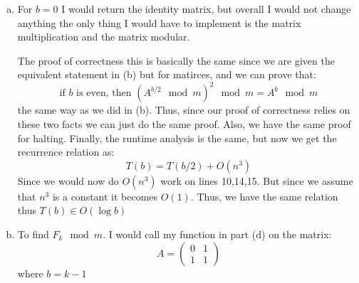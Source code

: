 \documentclass[12pt, letterpaper]{article}
\theoremstyle{definition}
\newcommand{\N}{\mathbb{N}}
\renewcommand{\t}[1]{\text{#1}}
\begin{document}
\begin{enumerate}[(a)]
\begin{itemize}
        Thus, by induction our algorithm works for all $n \in \N$.

        \item (Proof it Stops)
        
        Let our potential function be $b$. WLOG let $b \neq 0,1$ since we would halt immediately.

        Thus, if $b$ is even then $b \mapsto b/2 < b$, and the minimum $b$ can be without halting the program immediately is $2$ thus $b-b/2 \geq 2-1= 1$

        If $b$ is odd then $b-1$ is even thus $b \mapsto (b-1)/2 < b$. Again the min odd number without halting immediately is $3$ thus $b-(b-1)/2 \geq 3-1=2$

        Our function is lower bounded by $0$. Thus our functions stops.

        \item (Runtime Analysis)
        
        We can ignore the base cases since they are all $O(1)$ operations. Now, if $b$ is even then we call on our function on $b/2$, and this is the same in the odd case, and since we return after the recursive call we only make one each loop. The rest of the lines we can assume do $O(1)$ work thus we end up with the recurrence relation:
        \[T(b)=T(b/2)+O(1)\]
        Thus by the Master Theorem we get that $T(b) \in O(\log b)$
    \end{itemize}

    \item For $b=0$ I would return the identity matrix, but overall I would not change anything the only thing I would have to implement is the matrix multiplication and the matrix modular.
    
    The proof of correctness this is basically the same since we are given the equivalent statement in (b) but for matirces, and we can prove that:
    \[\t{if } b \t{ is even, then } (A^{b/2} \mod m)^2 \mod m = A^b \mod m\]
    the same way as we did in (b). Thus, since our proof of correctness relies on these two facts we can just do the same proof. Also, we have the same proof for halting. Finally, the runtime analysis is the same, but now we get the recurrence relation as:
    \[T(b)=T(b/2)+O(n^3)\]
    Since we would now do $O(n^3)$ work on lines 10,14,15. But since we assume that $n^3$ is a constant it becomes $O(1)$. Thus, we have the same relation thus $T(b) \in O(\log b)$

    \item To find $F_k \mod m$. I would call my function in part (d) on the matrix:
    $$A= \begin{pmatrix}
        0 & 1\\
        1 & 1
    \end{pmatrix}$$
    where $b=k-1$


\end{enumerate}
\end{document}
